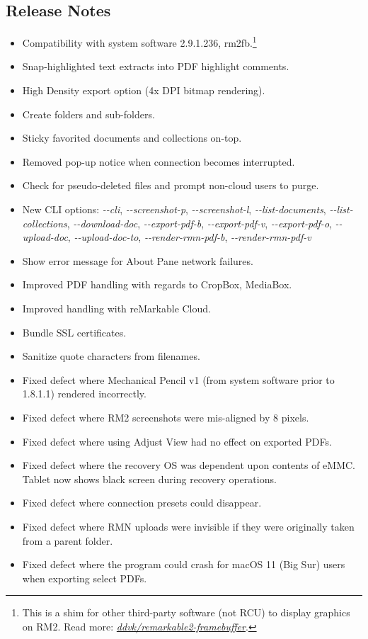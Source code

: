 \subsection{Release Notes}
\begin{itemize}
\item{Compatibility with system software 2.9.1.236, rm2fb.\footnote{This is a shim for other third-party software (not RCU) to display graphics on RM2. Read more: \textit{\href{https://github.com/ddvk/remarkable2-framebuffer}{ddvk/remarkable2-framebuffer}}.}}
  \item{Snap-highlighted text extracts into PDF highlight comments.}
  \item{High Density export option (4x DPI bitmap rendering).}
  \item{Create folders and sub-folders.}
\item{Sticky favorited documents and collections on-top.}
\item{Removed pop-up notice when connection becomes interrupted.}
  \item{Check for pseudo-deleted files and prompt non-cloud users to purge.}
    \item{New CLI options: \textit{\--\--cli}, \textit{\--\--screenshot-p}, \textit{\--\--screenshot-l}, \textit{\--\--list-documents}, \textit{\--\--list-collections}, \linebreak\textit{\--\--download-doc}, \textit{\--\--export-pdf-b}, \textit{\--\--export-pdf-v}, \textit{\--\--export-pdf-o}, \textit{\--\--upload-doc}, \linebreak\textit{\--\--upload-doc-to}, \textit{\--\--render-rmn-pdf-b}, \textit{\--\--render-rmn-pdf-v}}
    \item{Show error message for About Pane network failures.}
\item{Improved PDF handling with regards to CropBox, MediaBox.}
\item{Improved handling with reMarkable Cloud.}
\item{Bundle SSL certificates.}
  \item{Sanitize quote characters from filenames.}
\item{Fixed defect where Mechanical Pencil v1 (from system software prior to 1.8.1.1) rendered incorrectly.}
  \item{Fixed defect where RM2 screenshots were mis-aligned by 8 pixels.}
  \item{Fixed defect where using Adjust View had no effect on exported PDFs.}
  \item{Fixed defect where the recovery OS was dependent upon contents of eMMC. Tablet now shows black screen during recovery operations.}
  \item{Fixed defect where connection presets could disappear.}
  \item{Fixed defect where RMN uploads were invisible if they were originally taken from a parent folder.}
    \item{Fixed defect where the program could crash for macOS 11 (Big Sur) users when exporting select PDFs.}
    

\end{itemize}

